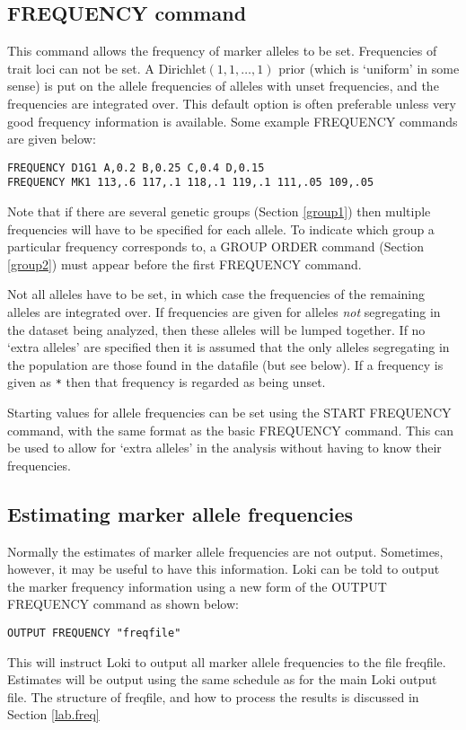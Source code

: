 \documentclass[10pt,a4paper]{article}
\begin{document}
\subsection{FREQUENCY command}
This command allows the frequency of marker alleles to be set. Frequencies
of trait loci can not be set. A Dirichlet$(1,1,\ldots ,1)$ prior (which is
`uniform' in some sense) is put on the allele frequencies of alleles with
unset frequencies, and the frequencies are integrated over.  This default
option is often preferable unless very good frequency information is
available.  Some example FREQUENCY commands are given below:
\begin{verbatim}
FREQUENCY D1G1 A,0.2 B,0.25 C,0.4 D,0.15
FREQUENCY MK1 113,.6 117,.1 118,.1 119,.1 111,.05 109,.05
\end{verbatim}
Note that if there are several genetic groups (Section \ref{group1}) then
multiple frequencies will have to be specified for each allele.  To indicate
which group a particular frequency corresponds to, a GROUP ORDER command
(Section \ref{group2}) must appear before the first FREQUENCY command.

Not all alleles have to be set, in which case the frequencies of the
remaining alleles are integrated over.  If frequencies are given for alleles
\emph{not} segregating in the dataset being analyzed, then these alleles
will be lumped together.  If no `extra alleles' are specified then it is
assumed that the only alleles segregating in the population are those found
in the datafile (but see below).  If a frequency is given as \verb+*+ then
that frequency is regarded as being unset.

Starting values for allele frequencies can be set using the START FREQUENCY
command, with the same format as the basic FREQUENCY command.  This can be used
to allow for `extra alleles' in the analysis without having to know their
frequencies.
\subsection{Estimating marker allele frequencies}
\label{lab.freq1}
Normally the estimates of marker allele frequencies are not output.
Sometimes, however, it may be useful to have this information.  Loki can be
told to output the marker frequency information using a new form of the
OUTPUT FREQUENCY command as shown below:
\begin{verbatim}
OUTPUT FREQUENCY "freqfile"	 
\end{verbatim}
This will instruct Loki to output all marker allele frequencies to the file
freqfile.  Estimates will be output using the same schedule as for the main
Loki output file.  The structure of freqfile, and how to process the results
is discussed in Section \ref{lab.freq}
\end{document}

